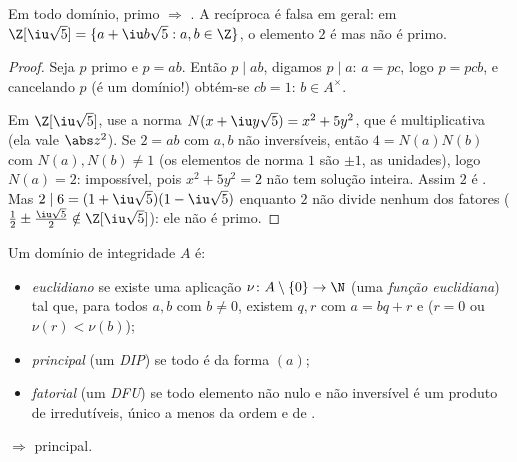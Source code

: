 \begin{proposition}\label{prop:b3:rings:primeirred}
Em todo domínio, primo $\Rightarrow$ . A recíproca é falsa em geral:
em $\Z[\iu\sqrt 5] = \{a + \iu b\sqrt5 : a, b
\in \Z\}$, o elemento $2$ é  mas não é primo.
\end{proposition}

\begin{proof}
Seja $p$ primo e $p = ab$. Então $p \mid ab$, digamos $p \mid a$:
$a = pc$, logo $p = pcb$, e cancelando $p$ (é um domínio!) obtém-se
$cb =
1$: $b \in A^\times$.

Em $\Z[\iu\sqrt5]$, use a norma $N(x + \iu y\sqrt 5) = x^2 +
5y^2$, que é multiplicativa (ela vale $\abs z^2$). Se
$2 = ab$ com $a, b$ não inversíveis, então $4 = N(a)N(b)$ com $N(a), N(b) \neq
1$ (os
elementos de norma $1$ são $\pm1$, as unidades), logo $N(a) = 2$:
impossível, pois $x^2 + 5y^2 = 2$ não tem solução inteira. Assim $2$ é
. Mas $2 \mid 6 = (1 + \iu\sqrt5)(1 - \iu\sqrt5)$ enquanto $2$ não divide nenhum dos fatores
($\frac12 \pm \frac{\iu\sqrt5}2
\notin \Z[\iu\sqrt5]$): ele não é primo.
\end{proof}

\begin{definition}\label{def:b3:rings:pidufd}
Um domínio de integridade $A$ é:
\begin{itemize}
  \item \emph{euclidiano} se existe uma
        aplicação $\nu \colon A \setminus \{0\} \to \N$ (uma \emph{função euclidiana}) tal que, para
        todos $a, b$ com $b \ne 0$, existem $q, r$ com $a = bq + r$ e
        ($r = 0$ ou $\nu(r) <
        \nu(b)$);
  \item \emph{principal} (um \emph{DIP}) se todo  é da forma $(a)$;
  \item \emph{fatorial} (um \emph{DFU}) se todo elemento não nulo e não inversível é um produto
        de irredutíveis, único a menos da ordem e de .
\end{itemize}
\end{definition}

\begin{theorem}\label{thm:b3:rings:euclideanpid}
 $\Rightarrow$ principal.
\end{theorem}

